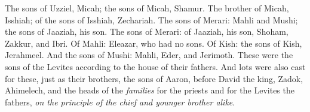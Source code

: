 \begin{biblechapter}
\verse The sons of Uzziel, Micah; the sons of Micah, Shamur.
\verse The brother of Micah, Isshiah; of the sons of Isshiah, Zechariah.
\verse The sons of Merari: Mahli and Mushi; the sons of Jaaziah, his son.
\verse The sons of Merari: of Jaaziah, his son, Shoham, Zakkur, and Ibri.
\verse Of Mahli: Eleazar, who had no sons.
\verse Of Kish: the sons of Kish, Jerahmeel.
\verse And the sons of Mushi: Mahli, Eder, and Jerimoth. These were the sons of the Levites according to the house of their fathers.
\verse And lots were also cast for these, just as their brothers, the sons of Aaron, before David the king, Zadok, Ahimelech, and the heads of the \textit{families} for the priests and for the Levites the fathers, \textit{on the principle of the chief and younger brother alike}.
\end{biblechapter}

